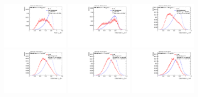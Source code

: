 \begin{figure}[H]
\includegraphics[width=0.3\textwidth]{sascha_input/Appendix/Distributions/top/distributions/beta1/h_normal_tj_nSub32_bin6.pdf} 
\bigskip
\includegraphics[width=0.3\textwidth]{sascha_input/Appendix/Distributions/top/distributions/beta1/h_recoJet_nSub32_bin1.pdf} \hspace{1mm}
\includegraphics[width=0.3\textwidth]{sascha_input/Appendix/Distributions/top/distributions/beta1/h_recoJet_nSub32_bin2.pdf} \hspace{1mm}
\includegraphics[width=0.3\textwidth]{sascha_input/Appendix/Distributions/top/distributions/beta1/h_recoJet_nSub32_bin3.pdf} 
\bigskip
\includegraphics[width=0.3\textwidth]{sascha_input/Appendix/Distributions/top/distributions/beta1/h_recoJet_nSub32_bin4.pdf} \hspace{6mm}
\includegraphics[width=0.3\textwidth]{sascha_input/Appendix/Distributions/top/distributions/beta1/h_recoJet_nSub32_bin5.pdf} \hspace{6mm}

\end{figure}
